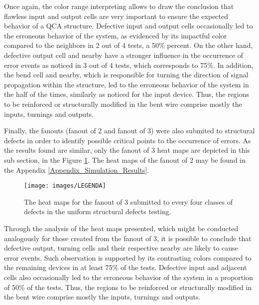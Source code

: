 Once again, the color range interpreting allows to draw the conclusion that flawless input and output cells are very important to ensure the expected behavior of a QCA structure. Defective input and output cells occasionally led to the erroneous behavior of the system, as evidenced by its impactful color compared to the neighbors in 2 out of 4 tests, a 50\% percent.  On the other hand, defective output cell and nearby have a stronger influence in the occurrence of error events as noticed in 3 out of 4 tests, which corresponds to 75\%. In addition, the bend cell and nearby, which is responsible for turning the direction of signal propagation within the structure, led to the erroneous behavior of the system in the half of the times, similarly as noticed for the input device. Thus, the regions to be reinforced or structurally modified in the bent wire comprise mostly the inputs, turnings and outputs.

Finally, the fanouts (fanout of 2 and fanout of 3) were also submited to structural defects in order to identify possible critical points to the occurrence of errors. As the results found are similar, only the fanout of 3 heat maps are depicted in this sub section, in the Figure \ref{figure:reg_fanout3_uniform}. The heat maps of the fanout of 2 may be found in the Appendix \ref{Appendix_Simulation_Results}.

\begin{figure}[!ht]
\center
{}
\hfill
{}
\hfill
{}
\hfill
{}
\linebreak
{\texttt{[image: images/LEGENDA]}
}
\caption{The heat maps for the fanout of 3 submitted to every four classes of defects in the uniform structural defects testing.}
\label{figure:reg_fanout3_uniform}
\end{figure}

Through the analysis of the heat maps presented, which might be conducted analogously for those created from the fanout of 3, it is possible to conclude that defective output, turning cells and their respective nearby are likely to cause error events. Such observation is supported by its contrasting colors compared to the remaining devices in at least 75\% of the tests.  Defective input and adjacent cells also occasionally led to the erroneous behavior of the system in a proportion of 50\% of the tests.  Thus, the regions to be reinforced or structurally modified in the bent wire comprise mostly the inputs, turnings and outputs.


